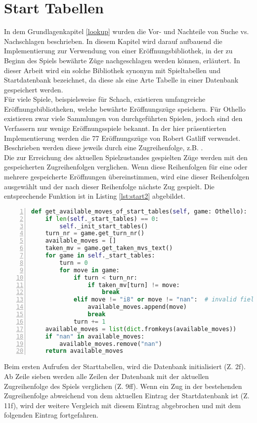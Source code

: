 \section{Start Tabellen}
In dem Grundlagenkapitel \ref{lookup} wurden die Vor- und Nachteile von Suche vs. Nachschlagen beschrieben. In diesem Kapitel wird darauf aufbauend die Implementierung zur Verwendung von einer Eröffnungsbibliothek, in der zu Beginn des Spiels bewährte Züge nachgeschlagen werden können, erläutert. In dieser Arbeit wird ein solche Bibliothek synonym mit Spieltabellen und Startdatenbank bezeichnet, da diese als eine Arte Tabelle in einer Datenbank gespeichert werden.
\\Für viele Spiele, beispielsweise für Schach, existieren umfangreiche Eröffnungsbibliotheken, welche bewährte Eröffnungszüge speichern. Für Othello existieren zwar viele Sammlungen von durchgeführten Spielen, jedoch sind den Verfassern nur wenige Eröffnungsspiele bekannt. In der hier präsentierten Implementierung werden die 77 Eröffnungszüge von Robert Gatliff \cite{open1} verwendet. Beschrieben werden diese jeweils durch eine Zugreihenfolge, z.B. . 
\\Die zur Erreichung des aktuellen Spielzustandes gespielten Züge werden mit den gespeicherten Zugreihenfolgen verglichen. Wenn diese Reihenfolgen für eine oder mehrere gespeicherte Eröffnungen übereinstimmen, wird eine dieser Reihenfolgen ausgewählt und der nach dieser Reihenfolge nächste Zug gespielt. Die entsprechende Funktion  ist in Listing \ref{lst:start2} abgebildet.
\newpage
\begin{lstlisting}[basicstyle=\footnotesize, caption = {Methode zur Bestimmung verfügbarer Startzüge }, language = python, captionpos = t , numbers=left, label={lst:start2}]
def get_available_moves_of_start_tables(self, game: Othello):
	if len(self._start_tables) == 0:
		self._init_start_tables()
	turn_nr = game.get_turn_nr()
	available_moves = []
	taken_mv = game.get_taken_mvs_text()
	for game in self._start_tables:
		turn = 0
		for move in game:
			if turn < turn_nr:
				if taken_mv[turn] != move:
					break
			elif move != "i8" or move != "nan":  # invalid field
				available_moves.append(move)
				break
			turn += 1
	available_moves = list(dict.fromkeys(available_moves))
	if "nan" in available_moves:
		available_moves.remove("nan")
	return available_moves
\end{lstlisting}
Beim ersten Aufrufen der Starttabellen, wird die Datenbank initialisiert (Z. 2f). Ab Zeile sieben werden alle Zeilen der Datenbank mit der aktuellen Zugreihenfolge des Spiels verglichen (Z. 9ff). Wenn ein Zug in der bestehenden Zugreihenfolge abweichend von dem aktuellen Eintrag der Startdatenbank ist (Z. 11f), wird der weitere Vergleich mit diesem Eintrag abgebrochen und mit dem folgenden Eintrag fortgefahren.
